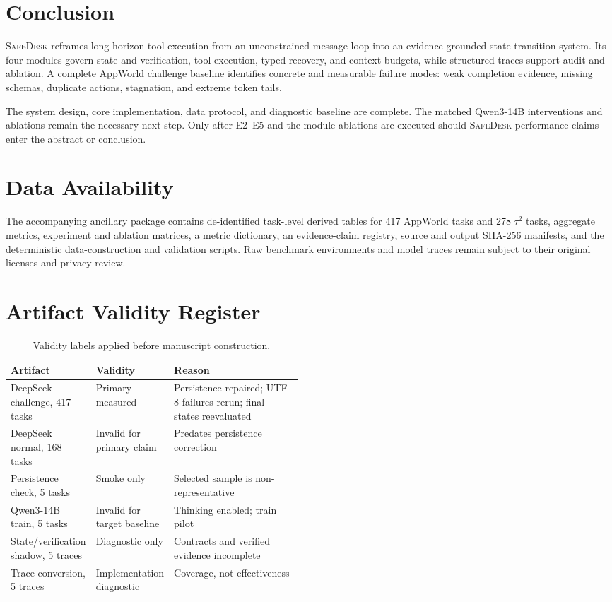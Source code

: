 \documentclass[10pt]{article}
\newcommand{\safedesk}{\textsc{SafeDesk}}
\begin{document}
\section{Conclusion}

\safedesk{} reframes long-horizon tool execution from an unconstrained message
loop into an evidence-grounded state-transition system. Its four modules govern
state and verification, tool execution, typed recovery, and context budgets, while
structured traces support audit and ablation. A complete AppWorld challenge
baseline identifies concrete and measurable failure modes: weak completion
evidence, missing schemas, duplicate actions, stagnation, and extreme token tails.

The system design, core implementation, data protocol, and diagnostic baseline are
complete. The matched Qwen3-14B interventions and ablations remain the necessary
next step. Only after E2--E5 and the module ablations are executed should
\safedesk{} performance claims enter the abstract or conclusion.

\section*{Data Availability}

The accompanying ancillary package contains de-identified task-level derived
tables for 417 AppWorld tasks and 278 $\tau^2$ tasks, aggregate metrics,
experiment and ablation matrices, a metric dictionary, an evidence-claim registry,
source and output SHA-256 manifests, and the deterministic data-construction and
validation scripts. Raw benchmark environments and model traces remain subject to
their original licenses and privacy review.

\appendix
\section{Artifact Validity Register}

\begin{table}[htbp]
\centering
\caption{Validity labels applied before manuscript construction.}
\label{tab:validity}
\small
\begin{tabularx}{\linewidth}{@{}p{0.28\linewidth}p{0.20\linewidth}Y@{}}
\toprule
Artifact & Validity & Reason \\
\midrule
DeepSeek challenge, 417 tasks & Primary measured & Persistence repaired;
UTF-8 failures rerun; final states reevaluated \\
DeepSeek normal, 168 tasks & Invalid for primary claim & Predates persistence correction \\
Persistence check, 5 tasks & Smoke only & Selected sample is non-representative \\
Qwen3-14B train, 5 tasks & Invalid for target baseline & Thinking enabled; train pilot \\
State/verification shadow, 5 traces & Diagnostic only & Contracts and verified evidence incomplete \\
Trace conversion, 5 traces & Implementation diagnostic & Coverage, not effectiveness \\
\bottomrule
\end{tabularx}
\end{table}
\end{document}
